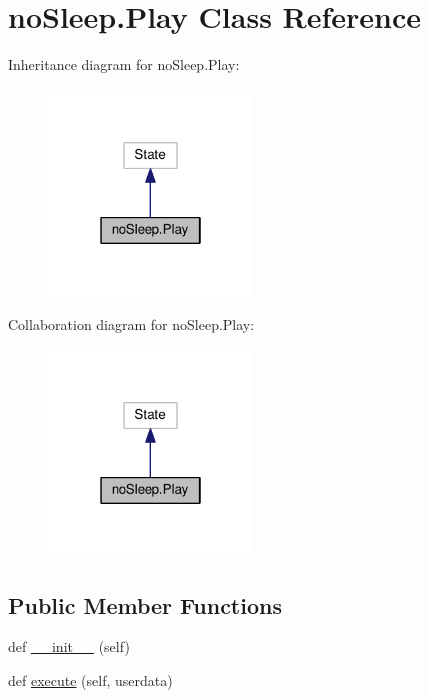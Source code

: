 \hypertarget{classnoSleep_1_1Play}{}\section{no\+Sleep.\+Play Class Reference}
\label{classnoSleep_1_1Play}


Inheritance diagram for no\+Sleep.\+Play\+:\nopagebreak
\begin{figure}[H]
\begin{center}
\leavevmode
\includegraphics[width=154pt]{classnoSleep_1_1Play__inherit__graph}
\end{center}
\end{figure}


Collaboration diagram for no\+Sleep.\+Play\+:\nopagebreak
\begin{figure}[H]
\begin{center}
\leavevmode
\includegraphics[width=154pt]{classnoSleep_1_1Play__coll__graph}
\end{center}
\end{figure}
\subsection*{Public Member Functions}
\begin{DoxyCompactItemize}
\item 
def \hyperlink{classnoSleep_1_1Play_a587a6f6981b7b8b741ffba66fbad8ded}{\+\_\+\+\_\+init\+\_\+\+\_\+} (self)
\item 
def \hyperlink{classnoSleep_1_1Play_ab0ab4ba67c0feb27958d4f6655f9e104}{execute} (self, userdata)
\end{DoxyCompactItemize}
